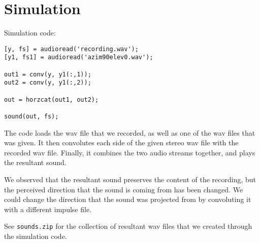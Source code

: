 \documentclass[titlepage]{article}
\begin{document}
\section*{Simulation}

Simulation code:

\begin{verbatim}
[y, fs] = audioread('recording.wav');
[y1, fs1] = audioread('azim90elev0.wav');

out1 = conv(y, y1(:,1));
out2 = conv(y, y1(:,2));

out = horzcat(out1, out2);

sound(out, fs);
\end{verbatim}

The code loads the wav file that we recorded, as well as one of the wav files that was given.
It then convolutes each side of the given stereo wav file with the recorded wav file.
Finally, it combines the two audio streams together, and plays the resultant sound.

We observed that the resultant sound preserves the content of the recording, but
the perceived direction that the sound is coming from has been changed. We could
change the direction that the sound was projected from by convoluting it with
a different impulse file.

See \texttt{sounds.zip} for the collection of resultant wav files that we created
through the simulation code.
\end{document}
